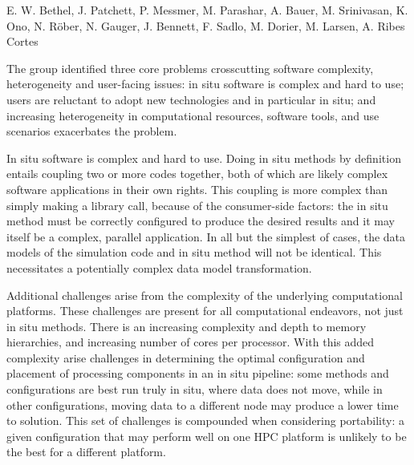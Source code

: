 
\license

 E. W. Bethel, J. Patchett, P. Messmer, M. Parashar, A. Bauer, M. Srinivasan, K. Ono, N. Röber, N. Gauger, J. Bennett, F. Sadlo, M. Dorier, M. Larsen, A. Ribes Cortes

\begin{refsection}

The group identified three core problems crosscutting software complexity, heterogeneity and user-facing issues: in situ software is complex and hard to use; users are reluctant to adopt new technologies and in particular in situ; and increasing heterogeneity in computational resources, software tools, and use scenarios exacerbates the problem. 

In situ software is complex and hard to use. 
Doing in situ methods by definition entails coupling two or more codes together, both of which are likely complex software applications in their own rights. 
This coupling is more complex than simply making a library call, because of the consumer-side factors: the in situ method must be correctly configured to produce the desired results and it may itself be a complex, parallel application. 
In all but the simplest of cases, the data models of the simulation code and in situ method will not be identical.
This necessitates a potentially complex data model transformation.

Additional challenges arise from the complexity of the underlying computational platforms.
These challenges are present for all computational endeavors, not just in situ methods. 
There is an increasing complexity and depth to memory hierarchies, and increasing number of cores per processor. 
With this added complexity arise challenges in determining the optimal configuration and placement of processing components in an in situ pipeline: some methods and configurations are best run truly in situ, where data does not move, while in other configurations, moving data to a different node may produce a lower time to solution. 
This set of challenges is compounded when considering portability: a given configuration that may perform well on one HPC platform is unlikely to be the best for a different platform.


\end{refsection}
